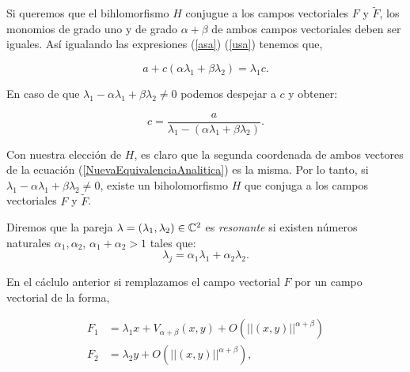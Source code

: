 \noindent Si queremos que el bihlomorfismo $H$ conjugue a los campos vectoriales $F$ y $\tilde{F}$, los monomios de grado uno y de grado $\alpha + \beta$ de ambos campos vectoriales deben ser iguales. Así igualando las expresiones (\ref{asa}) (\ref{usa}) tenemos que,

\begin{equation*}
a+c(\alpha\lambda_{1}+\beta\lambda_{2})=\lambda_{1}c.
\end{equation*}

En caso de que $\lambda_{1}-\alpha\lambda_{1}+\beta\lambda_{2}\neq 0$ podemos despejar a $c$ y obtener:


\begin{equation*}
c = \frac{a}{\lambda_{1} -(\alpha\lambda_{1} + \beta\lambda_{2})}.
\end{equation*}

Con nuestra elección de $H$, es claro que la segunda coordenada de ambos vectores de la ecuación (\ref{NuevaEquivalenciaAnalitica}) es la misma. Por lo tanto, si $\lambda_{1}-\alpha\lambda_{1}+\beta\lambda_{2}\neq 0$, existe un biholomorfismo $H$ que conjuga a los campos vectoriales $F$ y $\tilde{F}$.
\begin{defn}
\label{Def:Resonancias}
Diremos que la pareja $\lambda=(\lambda_{1},\lambda_{2})\in\mathbb{C}^{2}$ es \emph{resonante} si existen números naturales $\alpha_{1},\alpha_{2}$, $\alpha_{1}+\alpha_{2}>1$ tales que:
\begin{equation}
\label{Denominadores}
\lambda_{j}=\alpha_{1}\lambda_{1}+\alpha_{2}\lambda_{2}.
\end{equation}
\end{defn}

En el cáclulo anterior si remplazamos el campo vectorial $F$ por un campo vectorial de la forma,

\begin{equation*}
\begin{aligned}
F_{1} &= \lambda_{1}x +V_{\alpha+\beta}(x,y)+O(||(x,y)||^{\alpha+\beta})\\
F_{2} &= \lambda_{2}y + O(||(x,y)||^{\alpha+\beta}),
\end{aligned}
\end{equation*}

